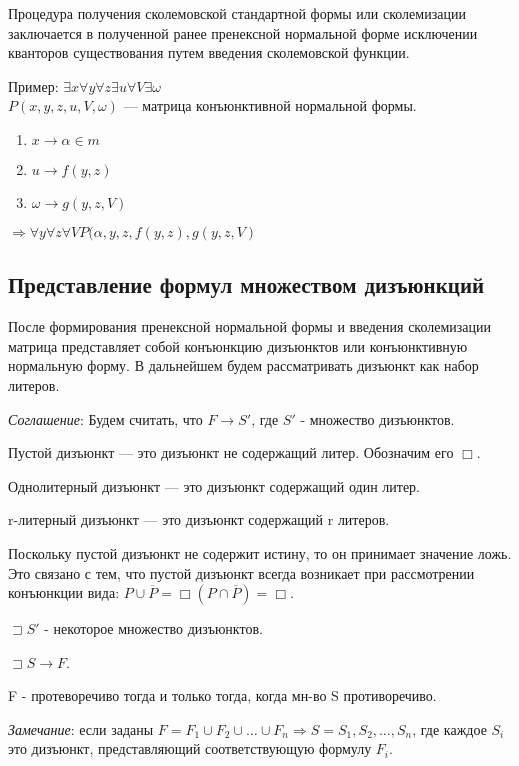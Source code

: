 \documentclass[a4paper,12pt]{report}
\begin{document}
	Процедура получения сколемовской стандартной формы или сколемизации
	заключается в полученной ранее пренексной нормальной форме исключении
	кванторов существования путем введения сколемовской функции.\par
	Пример: $\exists x \forall y \forall z \exists u \forall V \exists \omega$\\
	$P(x,y,z,u,V,\omega)$ --- матрица конъюнктивной нормальной формы.\par

	\begin{enumerate}
		\item $x \to \alpha \in m$
		\item $u \to f(y,z)$
		\item $\omega \to g(y,z,V)$
	\end{enumerate}
	$\Rightarrow \forall y \forall z \forall V P(\alpha,y,z,f(y,z),g(y,z,V)$


\subsection{Представление формул множеством дизъюнкций}

	После формирования пренексной нормальной формы и введения сколемизации
	матрица представляет собой конъюнкцию дизъюнктов или конъюнктивную нормальную
	форму. В дальнейшем будем рассматривать дизъюнкт как набор литеров.\\ \par
	\textit{Соглашение}: Будем считать, что $F \to S'$, где $S'$ - множество
	дизъюнктов.\\ \par

	Пустой дизъюнкт --- это дизъюнкт не содержащий литер. Обозначим его
	$\Box$.\par
	Однолитерный дизъюнкт --- это дизъюнкт содержащий один литер.\par
	r-литерный дизъюнкт --- это дизъюнкт содержащий r литеров.\\ \par

	Поскольку пустой дизъюнкт не содержит истину, то он принимает значение ложь.
	Это связано с тем, что пустой дизъюнкт всегда возникает при рассмотрении
	конъюнкции вида: $P \cup \overline{P} = \Box(P \cap \overline{P}) = \Box$.
	\\ \par

	$\sqsupset S'$ - некоторое множество дизъюнктов.\par
	$\sqsupset S \to F$.\par
	F - протеворечиво тогда и только тогда, когда мн-во S противоречиво. \\ \par

	\textit{Замечание}: если заданы $F = F_1 \cup F_2 \cup \ldots \cup F_n
	\Rightarrow S = {S_1, S_2, \ldots , S_n}$, где каждое $S_i$ это дизъюнкт,
	представляющий соответствующую формулу $F_i$.
\end{document}
